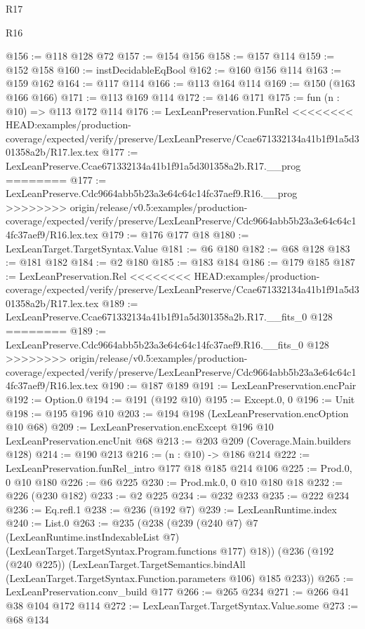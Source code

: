\begin{lexlean}{R17}
\begin{lexlean}{R16}
\begin{coremodule}
{{{{{@156 := @118 @128 @72
@157 := @154 @156
@158 := @157 @114
@159 := @152 @158
@160 := instDecidableEqBool
@162 := @160 @156 @114
@163 := @159 @162
@164 := @117 @114
@166 := @113 @164 @114
@169 := @150 (@163 @166 @166)
@171 := @113 @169 @114
@172 := @146 @171
@175 := fun (n : @10) => @113 @172 @114
@176 := LexLeanPreservation.FunRel
<<<<<<<< HEAD:examples/production-coverage/expected/verify/preserve/LexLeanPreserve/Ccae671332134a41b1f91a5d301358a2b/R17.lex.tex
@177 := LexLeanPreserve.Ccae671332134a41b1f91a5d301358a2b.R17.__prog
========
@177 := LexLeanPreserve.Cdc9664abb5b23a3e64c64c14fc37aef9.R16.__prog
>>>>>>>> origin/release/v0.5:examples/production-coverage/expected/verify/preserve/LexLeanPreserve/Cdc9664abb5b23a3e64c64c14fc37aef9/R16.lex.tex
@179 := @176 @177 @18
@180 := LexLeanTarget.TargetSyntax.Value
@181 := @6 @180
@182 := @68 @128
@183 := @181 @182
@184 := @2 @180
@185 := @183 @184
@186 := @179 @185
@187 := LexLeanPreservation.Rel
<<<<<<<< HEAD:examples/production-coverage/expected/verify/preserve/LexLeanPreserve/Ccae671332134a41b1f91a5d301358a2b/R17.lex.tex
@189 := LexLeanPreserve.Ccae671332134a41b1f91a5d301358a2b.R17.__fits_0 @128
========
@189 := LexLeanPreserve.Cdc9664abb5b23a3e64c64c14fc37aef9.R16.__fits_0 @128
>>>>>>>> origin/release/v0.5:examples/production-coverage/expected/verify/preserve/LexLeanPreserve/Cdc9664abb5b23a3e64c64c14fc37aef9/R16.lex.tex
@190 := @187 @189
@191 := LexLeanPreservation.encPair
@192 := Option.{0}
@194 := @191 (@192 @10)
@195 := Except.{0, 0}
@196 := Unit
@198 := @195 @196 @10
@203 := @194 @198 (LexLeanPreservation.encOption @10 @68)
@209 := LexLeanPreservation.encExcept @196 @10 LexLeanPreservation.encUnit @68
@213 := @203 @209 (Coverage.Main.builders @128)
@214 := @190 @213
@216 := (n : @10) -> @186 @214
@222 := LexLeanPreservation.funRel_intro @177 @18 @185 @214 @106
@225 := Prod.{0, 0} @10 @180
@226 := @6 @225
@230 := Prod.mk.{0, 0} @10 @180 @18
@232 := @226 (@230 @182)
@233 := @2 @225
@234 := @232 @233
@235 := @222 @234
@236 := Eq.refl.{1}
@238 := @236 (@192 @7)
@239 := LexLeanRuntime.index
@240 := List.{0}
@263 := @235
    (@238
      (@239
        (@240 @7)
        @7
        (LexLeanRuntime.instIndexableList @7)
        (LexLeanTarget.TargetSyntax.Program.functions @177)
        @18))
    (@236
      (@192 (@240 @225))
      (LexLeanTarget.TargetSemantics.bindAll
        (LexLeanTarget.TargetSyntax.Function.parameters @106)
        @185
        @233))
@265 := LexLeanPreservation.conv_build @177
@266 := @265 @234
@271 := @266 @41 @38 @104 @172 @114
@272 := LexLeanTarget.TargetSyntax.Value.some
@273 := @68 @134
}}}}}
\end{coremodule}
\end{lexlean}
\end{lexlean}
